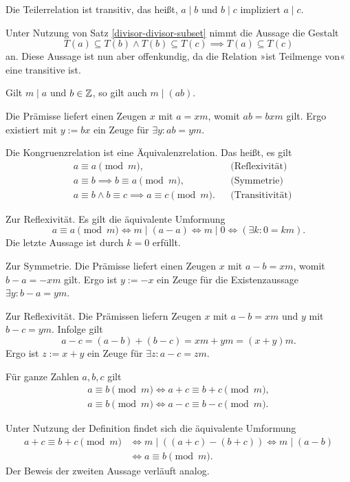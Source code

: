 \begin{Satz}
Die Teilerrelation ist transitiv, das heißt,
$a\mid b$ und $b\mid c$ impliziert $a\mid c$.
\end{Satz}
\begin{Beweis}
Unter Nutzung von Satz \ref{divisor-divisor-subset}
nimmt die Aussage die Gestalt
\[T(a)\subseteq T(b)\land T(b)\subseteq T(c)\implies T(a)\subseteq T(c)\]
an. Diese Aussage ist nun aber offenkundig, da die Relation »ist
Teilmenge von« eine transitive ist.\,\qedsymbol
\end{Beweis}

\begin{Satz}\label{divides-weaken}
Gilt $m\mid a$ und $b\in\mathbb Z$, so gilt auch $m\mid (ab)$.
\end{Satz}
\begin{Beweis}
Die Prämisse liefert einen Zeugen $x$ mit $a=xm$, womit $ab=bxm$
gilt. Ergo existiert mit $y:=bx$ ein Zeuge für
$\exists y\colon ab=ym$.\,\qedsymbol
\end{Beweis}

\begin{Satz}
Die Kongruenzrelation ist eine Äquivalenzrelation. Das heißt, es gilt
\begin{align*}
& a\equiv a\pmod m, && \text{(Reflexivität)}\\
& a\equiv b \implies b\equiv a\pmod m, && \text{(Symmetrie)}\\
& a\equiv b\land b\equiv c\implies a\equiv c\pmod m. && \text{(Transitivität)}
\end{align*}
\end{Satz}
\begin{Beweis}
Zur Reflexivität. Es gilt die äquivalente Umformung
\[a\equiv a\pmod m \iff m\mid (a-a) \iff m\mid 0\iff (\exists k\colon 0 = km).\]
Die letzte Aussage ist durch $k=0$ erfüllt.

Zur Symmetrie. Die Prämisse liefert einen Zeugen $x$ mit $a-b = xm$,
womit $b-a = -xm$ gilt. Ergo ist $y:=-x$ ein Zeuge für die
Existenzaussage $\exists y\colon b-a = ym$.

Zur Reflexivität. Die Prämissen liefern Zeugen $x$ mit $a-b=xm$
und $y$ mit $b-c=ym$. Infolge gilt
\[a-c = (a-b) + (b-c) = xm + ym = (x+y)m.\]
Ergo ist $z:=x+y$ ein Zeuge für $\exists z\colon a-c = zm$.\,\qedsymbol
\end{Beweis}

\begin{Satz}\label{cong-shift}
Für ganze Zahlen $a,b,c$ gilt
\begin{gather*}
a\equiv b\pmod m \iff a+c\equiv b+c \pmod m,\\
a\equiv b\pmod m \iff a-c\equiv b-c \pmod m.
\end{gather*}
\end{Satz}
\begin{Beweis}
Unter Nutzung der Definition findet sich die äquivalente Umformung
\begin{align*}
a+c\equiv b+c\pmod m &\iff m\mid ((a+c)-(b+c))
\iff m\mid (a-b)\\
&\iff a\equiv b\pmod m.
\end{align*}
Der Beweis der zweiten Aussage verläuft analog.\,\qedsymbol
\end{Beweis}

